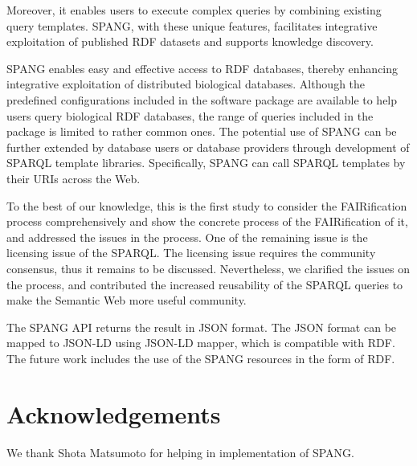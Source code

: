 \documentclass[runningheads]{llncs}
\begin{document}
Moreover, it enables users to execute complex queries by combining existing query templates. SPANG, with these unique features, facilitates integrative exploitation of published RDF datasets and supports knowledge discovery. 

SPANG enables easy and effective access to RDF databases, thereby enhancing integrative exploitation of distributed biological databases.
Although the predefined configurations included in the software package are available to help users query biological RDF databases, 
the range of queries included in the package is limited to rather common ones.
The potential use of SPANG can be further extended by database users or database providers through development of SPARQL template libraries.
Specifically, SPANG can call SPARQL templates by their URIs across the Web.

To the best of our knowledge, this is the first study to consider the FAIRification process comprehensively and show the concrete process of the FAIRification of it, and addressed the issues in the process. One of the remaining issue is the licensing issue of the SPARQL. The licensing issue requires the community consensus, thus it remains to be discussed. Nevertheless, we clarified the issues on the process, and contributed the increased reusability of the SPARQL queries to make the Semantic Web more useful community.

The SPANG API returns the result in JSON format. The JSON format can be mapped to JSON-LD using JSON-LD mapper, which is compatible with RDF. The future work includes the use of the SPANG resources in the form of RDF.


\section*{Acknowledgements}
We thank Shota Matsumoto for helping in implementation of SPANG.
\end{document}
